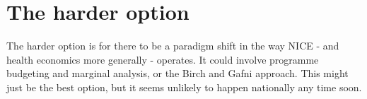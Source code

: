 \section{The harder option}
The harder option is for there to be a paradigm shift in the way NICE - and health economics more generally - operates. It could involve programme budgeting and marginal analysis, or the Birch and Gafni approach\cite{Ruta_2005,Birch_1992,Gafni_2006}. This might just be the best option, but it seems unlikely to happen nationally any time soon.